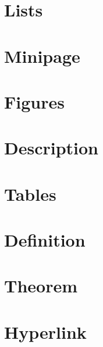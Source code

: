 
\section{Lists}
    

\section{Minipage}
    

\section{Figures}
    

\section{Description}
    

\section{Tables}
    

\section{Definition}
    

\section{Theorem}
    

\section{Hyperlink}
    
